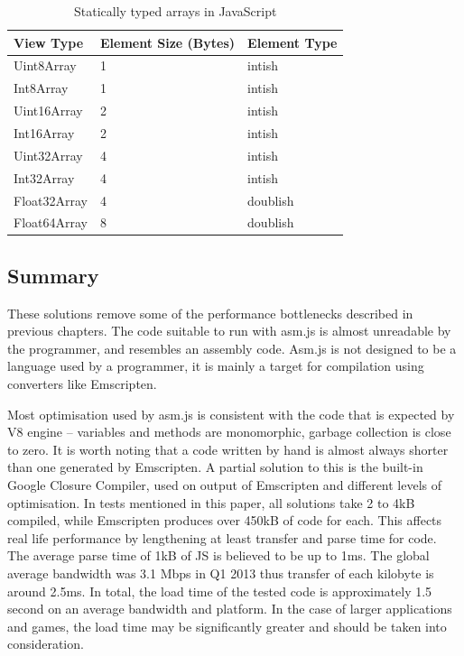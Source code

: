 \begin{table}[h!]
\caption{Statically typed arrays in JavaScript}
\centering
\label{table:jsarrays}
\begin{tabular}{|l|l|l|}
  	\hline
View Type & Element Size (Bytes) & Element Type \\ \hline
Uint8Array & 1 & intish \\ \hline
Int8Array & 1 & intish \\ \hline
Uint16Array & 2 & intish \\ \hline
Int16Array & 2 & intish \\ \hline
Uint32Array & 4 & intish \\ \hline
Int32Array & 4 & intish \\ \hline
Float32Array & 4 & doublish \\ \hline
Float64Array & 8 & doublish \\ \hline
\end{tabular}
\end{table}

\subsection{Summary}
\label{sec:asmjssummary}

These solutions remove some of the performance bottlenecks described in previous chapters. The code suitable to run with asm.js is almost unreadable by the programmer, and resembles an assembly code. Asm.js is not designed to be a language used by a programmer, it is mainly a target for compilation using converters like Emscripten.

Most optimisation used by asm.js is consistent with the code that is expected by V8 engine -- variables and methods are monomorphic, garbage collection is close to zero. It is worth noting that a code written by hand is almost always shorter than one generated by Emscripten. A partial solution to this is the built-in Google Closure Compiler, used on output of Emscripten and different levels of optimisation.
In tests mentioned in this paper, all solutions take 2 to 4kB compiled, while Emscripten produces over 450kB of code for each. This affects real life performance by lengthening at least transfer and parse time for code. The average parse time of 1kB of JS is believed to be up to 1ms\cite{best-practices-mobile}. The global average bandwidth was 3.1 Mbps in Q1 2013\cite{stateoftheinternet} thus transfer of each kilobyte is around 2.5ms. In total, the load time of the tested code is approximately 1.5 second on an average bandwidth and platform. In the case of larger applications and games, the load time may be significantly greater and should be taken into consideration.
